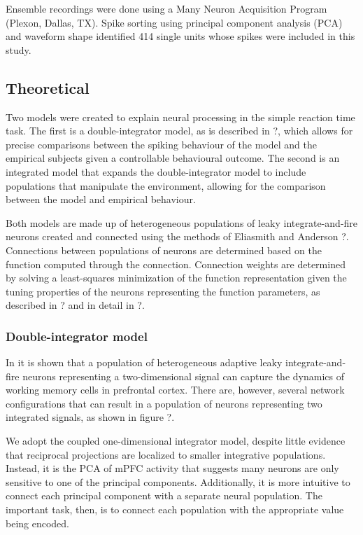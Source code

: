 \documentclass[12pt]{article}
\begin{document}
Ensemble recordings were done using a
Many Neuron Acquisition Program (Plexon, Dallas, TX).
Spike sorting using principal component analysis (PCA)
and waveform shape identified 414 single units
whose spikes were included in this study.

\subsection{Theoretical}

Two models were created to explain neural processing
in the simple reaction time task.
The first is a double-integrator model,
as is described in ?, %
which allows for precise comparisons
between the spiking behaviour of
the model and the empirical subjects
given a controllable behavioural outcome.
The second is an integrated model that
expands the double-integrator model
to include populations that manipulate the environment,
allowing for the comparison between
the model and empirical behaviour.

Both models are made up of heterogeneous populations
of leaky integrate-and-fire neurons
created and connected using the methods
of Eliasmith and Anderson ?. %
Connections between populations of neurons
are determined based on the function computed
through the connection.
Connection weights are determined
by solving a least-squares minimization
of the function representation
given the tuning properties
of the neurons representing the function parameters,
as described in ? %
and in detail in ?. %

\subsubsection{Double-integrator model}

In  %
it is shown that
a population of heterogeneous adaptive leaky integrate-and-fire neurons
representing a two-dimensional signal
can capture the dynamics of
working memory cells in prefrontal cortex.
There are, however, several network configurations
that can result in a population of neurons
representing two integrated signals,
as shown in figure ?. %

We adopt the coupled one-dimensional integrator model,
despite little evidence that reciprocal projections
are localized to smaller integrative populations.
Instead, it is the PCA of mPFC activity
that suggests many neurons are
only sensitive to one of the principal components.
Additionally, it is more intuitive
to connect each principal component with
a separate neural population.
The important task, then,
is to connect each population
with the appropriate value being encoded.
\end{document}
